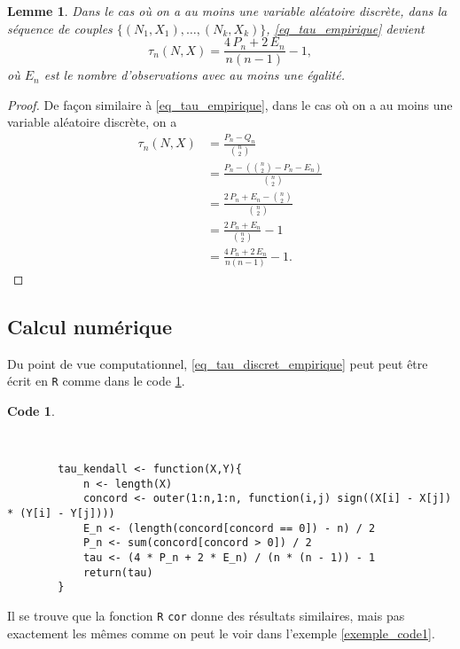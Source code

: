 \documentclass{article}
\newtheorem{lemme}{Lemme}
\newtheorem{code}{Code}
\begin{document}
	\begin{lemme}\label{lemme_empirique}
		Dans le cas où on a au moins une variable aléatoire discrète, dans la séquence de couples $\{(N_1, X_1), \dots, (N_k, X_k) \}$, \eqref{eq_tau_empirique} devient 
		\begin{equation}
			\tau_n(N,X) = \frac{4 \, P_n + 2 \, E_n}{n(n-1)} - 1, \label{eq_tau_discret_empirique}
		\end{equation}
		où $E_n$ est le nombre d'observations avec au moins une égalité.
	\end{lemme}
	\begin{proof}
		De façon similaire à \eqref{eq_tau_empirique}, dans le cas où on a au moins une variable aléatoire discrète, on a
		\begin{align}
		\tau_n(N,X) 
		&= \frac{P_n - Q_n}{ {n\choose 2} } \nonumber \\
		&= \frac{P_n - ({n\choose 2} - P_n - E_n)}{ {n\choose 2} } \nonumber \\
		&= \frac{2 \, P_n + E_n - {n\choose 2}}{ {n\choose 2} } \nonumber \\
		&= \frac{2 \, P_n + E_n }{ {n\choose 2} } - 1 \nonumber \\
		&= \frac{4 \, P_n + 2 \, E_n}{n(n-1)} - 1.
		\end{align}
	\end{proof}

	\subsection{Calcul numérique}
	Du point de vue computationnel, \eqref{eq_tau_discret_empirique} peut peut être écrit en \texttt{R} comme dans le code \ref{code_Kendall}.
	\begin{code}\label{code_Kendall}
		\begin{verbatim}
		
		
		tau_kendall <- function(X,Y){
		    n <- length(X)
		    concord <- outer(1:n,1:n, function(i,j) sign((X[i] - X[j]) * (Y[i] - Y[j])))
		    E_n <- (length(concord[concord == 0]) - n) / 2
		    P_n <- sum(concord[concord > 0]) / 2
		    tau <- (4 * P_n + 2 * E_n) / (n * (n - 1)) - 1
		    return(tau)
		}
		\end{verbatim}
	\end{code}

	Il se trouve que la fonction \texttt{R} \texttt{cor} donne des résultats similaires, mais pas exactement les mêmes comme on peut le voir dans l'exemple \ref{exemple_code1}.
	
\end{document}
